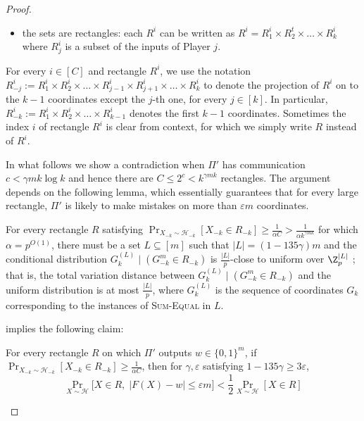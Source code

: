 \documentclass{toc}
\newcommand{\cond}{\;|\;}
\newcommand{\zo}{\ensuremath{ \{ 0, 1 \} }}
\newcommand{\gap}{\ensuremath{\varepsilon}}
\newcommand{\bigo}[1]{\ensuremath{{{O} \left( {#1} \right)}}}
\newcommand{\eqdef}{\ensuremath{:=}}
\newcommand{\sumequal}{\textsc{Sum-Equal} }
\begin{document}
\begin{proof}
\begin{claim}
\begin{itemize}
				\item the sets are rectangles: each $R^i$ can be written as $R^i=R_1^i\times R_2^t\times\ldots\times R_k^i$ where $R_j^i$ is a subset of the inputs of Player $j$.
			\end{itemize}
		\end{claim} 

		For every $i\in [C]$ and rectangle $R^i$, we use the notation $R^i_{-j}\eqdef R^i_{1} \times R^i_{2} \times \dots \times R^i_{j-1}\times R^i_{j+1}\times \dots \times R^i_k$ to denote the projection of $R^i$ on to the $k-1$ coordinates except the $j$-th one, for every $j\in[k]$. 
		In particular, $R^i_{-k}\eqdef R^i_{1} \times R^i_{2} \times \dots \times R^i_{k-1}$ denotes the first $k-1$ coordinates.
		Sometimes the index $i$ of rectangle $R^i$ is clear from context, for which we simply write $R$ instead of $R^i$.

		In what follows we show a contradiction when $\Pi'$ has communication $c<\gamma mk\log k$ and hence there are $C\le 2^c<k^{\gamma m k}$ rectangles.
		The argument depends on the following lemma, which essentially guarantees that for every large rectangle, $\Pi'$ is likely to make mistakes on more than $\gap m$ coordinates.


		\begin{lemma}\label{lem: partial uniform}
			For every rectangle $R$ satisfying $\Pr_{X_{-k} \sim \mathcal{H}_{-k}}[X_{-k}\in R_{-k}]\ge \frac{1}{\alpha C}>\frac{1}{\alpha k^{\gamma mk}}$ for which $\alpha= p^{\bigo{1}}$,
			there must be a set $L\subseteq [m]$ such that $|L|=(1-135\gamma) m$ and {\color{black}the conditional distribution}
			$G_k^{(L)}\cond (G_{-k}^m \in R_{-k})$ is $\frac{|L|}{p}$-close to uniform over $\Z_p^{|L|}$ {\color{black} ; that is, the total variation distance between $G_k^{(L)}\cond (G_{-k}^m \in R_{-k})$ and the uniform distribution is at most $\frac{|L|}{p}$}, {\color{black} where $G_k^{(L)}$ is the sequence of coordinates $G_k$ corresponding to the instances of \sumequal in $L$.}
		\end{lemma}


		 implies the following claim:

		\begin{claim}\label{claim:ball}
			For every rectangle $R$ on which $\Pi'$ outputs $w\in \zo^m$,
			if $\Pr_{X_{-k} \sim \mathcal{H}_{-k}}\left[X_{-k}\in R_{-k}\right]\ge \frac{1}{\alpha C}$, 
			then for $\gamma,\gap$ satisfying $1-135\gamma \ge 3\gap$, 
			\begin{equation}\label{ineq:ball}
				  \Pr_{X \sim \mathcal{H}}\Big[ X\in R,\; \left|F(X)-w\right|\le \gap m \Big] 
				< \frac{1}{2} \Pr_{X \sim \mathcal{H}}\left[ X\in R\right]
			\end{equation} 	
		\end{claim} 


\end{proof}
\end{document}
